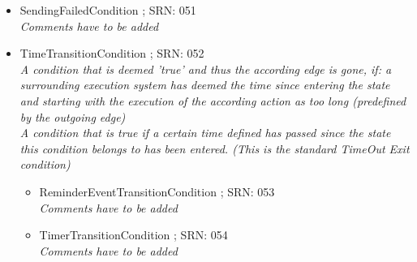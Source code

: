 \begin{itemize}
\begin{itemize}
\begin{itemize}
\begin{itemize}
\begin{itemize}
						\item SendingFailedCondition ; SRN: 051 \\ \textit{Comments have to be added}
						\item TimeTransitionCondition ; SRN: 052 \\ \textit{A condition that is deemed 'true' and thus the according edge is gone, if: a surrounding execution system has deemed the time since entering the state and starting with the execution of the according action as too long (predefined by the outgoing edge) \\ A condition that is true if a certain time defined has passed since the state this condition belongs to has been entered. (This is the standard TimeOut Exit condition)}
						\begin{itemize} 
							\item ReminderEventTransitionCondition ; SRN: 053 \\ \textit{Comments have to be added}
							\item TimerTransitionCondition ; SRN: 054 \\ \textit{Comments have to be added}
						\end{itemize}
					\end{itemize}
				\end{itemize}
			\end{itemize}		
			

\end{itemize}
\end{itemize}
